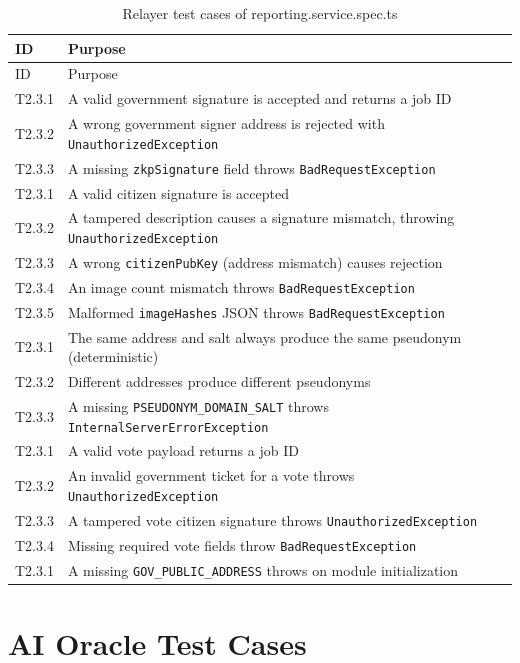 \begin{longtable}{p{}|p{}}
\caption{Relayer test cases of reporting.service.spec.ts} \\

 {ID} &   {Purpose} \\
\hline
\endfirsthead
\hline
  {ID} &   {Purpose} \\
\hline
\endhead
T2.3.1 & A valid government signature is accepted and returns a job ID \\
\hline
T2.3.2 & A wrong government signer address is rejected with \texttt{UnauthorizedException} \\
\hline
T2.3.3 & A missing \texttt{zkpSignature} field throws \texttt{BadRequestException} \\
\hline
T2.3.1 & A valid citizen signature is accepted \\
\hline
T2.3.2 & A tampered description causes a signature mismatch, throwing \texttt{UnauthorizedException} \\
\hline
T2.3.3 & A wrong \texttt{citizenPubKey} (address mismatch) causes rejection \\
\hline
T2.3.4 & An image count mismatch throws \texttt{BadRequestException} \\
\hline
T2.3.5 & Malformed \texttt{imageHashes} JSON throws \texttt{BadRequestException} \\
\hline
T2.3.1 & The same address and salt always produce the same pseudonym (deterministic) \\
\hline
T2.3.2 & Different addresses produce different pseudonyms \\
\hline
T2.3.3 & A missing \texttt{PSEUDONYM\_DOMAIN\_SALT} throws \texttt{InternalServerErrorException} \\
\hline
T2.3.1 & A valid vote payload returns a job ID \\
\hline
T2.3.2 & An invalid government ticket for a vote throws \texttt{UnauthorizedException} \\
\hline
T2.3.3 & A tampered vote citizen signature throws \texttt{UnauthorizedException} \\
\hline
T2.3.4 & Missing required vote fields throw \texttt{BadRequestException} \\
\hline
T2.3.1 & A missing \texttt{GOV\_PUBLIC\_ADDRESS} throws on module initialization \\
\end{longtable}


\section{AI Oracle Test Cases}
\label{apndx:ai-test-suite}


